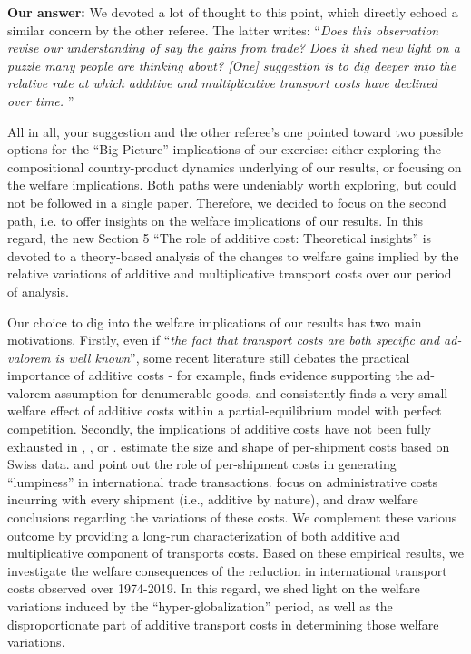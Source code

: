 \documentclass[a4paper,11pt]{article}
\begin{document}
\textbf{Our answer:} We devoted a lot of thought to this point, which directly echoed a similar concern by the other referee. The latter writes: ``\emph{Does this observation revise our understanding of say the gains from trade? Does it shed new light on a puzzle many people are thinking about? [One] suggestion is to dig deeper into the relative rate at which additive and multiplicative transport costs have declined over time.}
''

All in all, your suggestion and the other referee's one pointed toward two possible options for the ``Big Picture'' implications of our exercise: either exploring the compositional country-product dynamics underlying of our results, or focusing on the welfare implications. Both paths were undeniably worth exploring, but could not be followed in a single paper. Therefore, we decided to focus on the second path, i.e. to  offer insights on the welfare implications of our results. In this regard, the new Section 5 ``The role of additive cost: Theoretical insights'' is devoted to a theory-based analysis of the changes to welfare gains implied by the relative variations of additive and multiplicative transport costs over our period of analysis.

Our choice to dig into the welfare implications of our results has two main motivations. Firstly, even if ``\emph{the fact that transport costs are both specific and ad-valorem is well known}'', some recent literature still debates the practical importance of additive costs - for example, \cite{Lashkaripour_JIE2020} finds evidence supporting the ad-valorem assumption for denumerable goods, and consistently finds a very small welfare effect of additive costs within a partial-equilibrium model with perfect competition. Secondly, the implications of additive costs have not been fully exhausted in \citet{Irrazabal_2015}, \cite{Hornok-et-al-RES-2015, Hornok-et-al-JIE-2015}, \cite{Alessandria-et-al-AER-2010} or \citet{sorensen2014}. \cite{Kropf-Saure-JIE-2016} estimate the size and shape of per-shipment costs based on Swiss data. \cite{Alessandria-et-al-AER-2010} and \cite{Hornok-et-al-RES-2015} point out the role of per-shipment costs in generating ``lumpiness'' in international trade transactions. \cite{Hornok-et-al-JIE-2015} focus on administrative costs incurring with every shipment (i.e., additive by nature), and draw welfare conclusions regarding the variations of these costs. We complement these various outcome by providing a long-run characterization of both additive and multiplicative component of transports costs. Based on these empirical results, we investigate the welfare consequences of the reduction in international transport costs observed over 1974-2019. In this regard, we shed light on the welfare variations induced by the ``hyper-globalization'' period, as well as the disproportionate part of additive transport costs in determining those welfare variations.\smallskip
\end{document}
